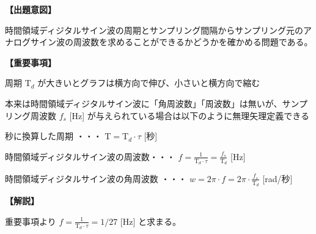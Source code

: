 \noindent \textbf{【出題意図】}

\bigskip
\noindent 時間領域ディジタルサイン波の周期とサンプリング間隔からサンプリング元のアナログサイン波の周波数を求めることができるかどうかを確かめる問題である。

\vspace{1em}
\noindent \textbf{【重要事項】}

\bigskip
\noindent 周期 $\textrm{T}_d$ が大きいとグラフは横方向で伸び、小さいと横方向で縮む

\bigskip
\noindent 本来は時間領域ディジタルサイン波に「角周波数」「周波数」は無いが、サンプリング周波数 $f_s$ [Hz] が与えられている場合は以下のように無理矢理定義できる

\bigskip
\noindent 秒に換算した周期 ・・・ $\textrm{T} = \textrm{T}_d \cdot \tau$ [秒]

\bigskip
\noindent 時間領域ディジタルサイン波の周波数・・・ $f = \frac{1}{\textrm{T}_d\cdot\tau} = \frac{f_s}{\textrm{T}_d}$ [Hz]

\bigskip
\noindent 時間領域ディジタルサイン波の角周波数 ・・・ $w = 2\pi \cdot f = 2 \pi \cdot \frac{f_s}{\textrm{T}_d}$ [rad/秒]

\bigskip

\vspace{1em}
\noindent \textbf{【解説】}

\bigskip
\noindent 重要事項より $f = \frac{1}{\textrm{T}_d\cdot\tau} = 1/27 $ [Hz] と求まる。

